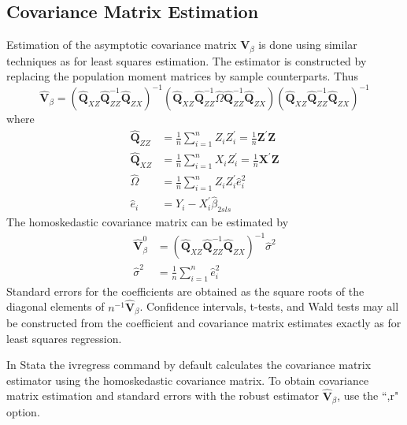 \documentclass[10pt]{article}
\begin{document}
\subsection{Covariance Matrix Estimation}
Estimation of the asymptotic covariance matrix $\boldsymbol{V}_{\beta}$ is done using similar techniques as for least squares estimation. The estimator is constructed by replacing the population moment matrices by sample counterparts. Thus
$$
\widehat{\boldsymbol{V}}_{\beta}=\left(\widehat{\mathbf{Q}}_{X Z} \widehat{\mathbf{Q}}_{Z Z}^{-1} \widehat{\mathbf{Q}}_{Z X}\right)^{-1}\left(\widehat{\mathbf{Q}}_{X Z} \widehat{\mathbf{Q}}_{Z Z}^{-1} \widehat{\Omega} \widehat{\mathbf{Q}}_{Z Z}^{-1} \widehat{\mathbf{Q}}_{Z X}\right)\left(\widehat{\mathbf{Q}}_{X Z} \widehat{\mathbf{Q}}_{Z Z}^{-1} \widehat{\mathbf{Q}}_{Z X}\right)^{-1}
$$
where
$$
\begin{aligned}
\widehat{\boldsymbol{Q}}_{Z Z} &=\frac{1}{n} \sum_{i=1}^{n} Z_{i} Z_{i}^{\prime}=\frac{1}{n} \boldsymbol{Z}^{\prime} \boldsymbol{Z} \\
\widehat{\boldsymbol{Q}}_{X Z} &=\frac{1}{n} \sum_{i=1}^{n} X_{i} Z_{i}^{\prime}=\frac{1}{n} \boldsymbol{X}^{\prime} \boldsymbol{Z} \\
\widehat{\Omega} &=\frac{1}{n} \sum_{i=1}^{n} Z_{i} Z_{i}^{\prime} \widehat{e}_{i}^{2} \\
\widehat{e}_{i} &=Y_{i}-X_{i}^{\prime} \widehat{\beta}_{2 s l s}
\end{aligned}
$$
The homoskedastic covariance matrix can be estimated by
$$
\begin{aligned}
\widehat{\boldsymbol{V}}_{\beta}^{0} &=\left(\widehat{\boldsymbol{Q}}_{X Z} \widehat{\boldsymbol{Q}}_{Z Z}^{-1} \widehat{\boldsymbol{Q}}_{Z X}\right)^{-1} \widehat{\sigma}^{2} \\
\widehat{\sigma}^{2} &=\frac{1}{n} \sum_{i=1}^{n} \widehat{e}_{i}^{2}
\end{aligned}
$$
Standard errors for the coefficients are obtained as the square roots of the diagonal elements of $n^{-1} \widehat{\boldsymbol{V}}_{\beta}$. Confidence intervals, t-tests, and Wald tests may all be constructed from the coefficient and covariance matrix estimates exactly as for least squares regression.

In Stata the ivregress command by default calculates the covariance matrix estimator using the homoskedastic covariance matrix. To obtain covariance matrix estimation and standard errors with the robust estimator $\widehat{\boldsymbol{V}}_{\beta}$, use the “,r" option.
\end{document}
